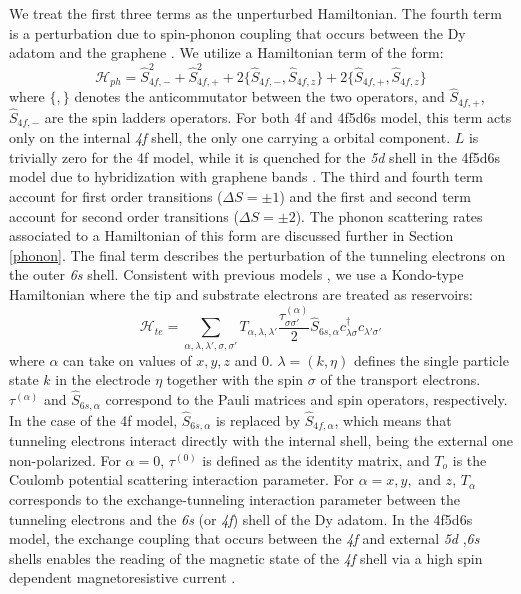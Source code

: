 \documentclass[reprint,amsmath,amssymb,aps,nofootinbib,onecolumn]{revtex4-2}
\begin{document}
We treat the first three terms as the unperturbed Hamiltonian. The fourth term is a perturbation due to spin-phonon coupling that occurs between the Dy adatom and the graphene \cite{Leuenberger2000,cervetti2016}. We utilize a Hamiltonian term of the form:
\begin{equation}
\mathcal{H}_{ph} = \hat{S}^{2}_{4f,-} + \hat{S}^{2}_{4f,+ } + 2 \{\hat{S}_{4f,-},\hat{S}_{4f,z}\} + 2 \{\hat{S}_{4f,+},\hat{S}_{4f,z}\}
\label{eq:ph}
\end{equation}
where $\{ ,\}$ denotes the anticommutator between the two operators, and $\hat{S}_{4f,+}$, $\hat{S}_{4f,-}$ are the spin ladders operators. For both 4f and 4f5d6s model, this term acts only on the internal \textit{4f} shell, the only one carrying a orbital component. $L$ is trivially zero for the 4f model, while it is quenched for the \textit{5d} shell in the 4f5d6s model due to hybridization with graphene bands \cite{donati2014}. The third and fourth term account for first order transitions ($\Delta S = \pm 1$) and the first and second term account for second order transitions ($\Delta S = \pm 2$). The phonon scattering rates associated to a Hamiltonian of this form are discussed further in Section \ref{phonon}. The final term describes the perturbation of the tunneling electrons on the outer \textit{6s} shell. Consistent with previous models \cite{anderson1966,schrieffer1966,appelbaum1967,delgado2010,loth2010,Ternes2015}, we use a Kondo-type Hamiltonian where the tip and substrate electrons are treated as reservoirs:  
\begin{equation}
\mathcal{H}_{te} = \sum_{\alpha,\lambda, \lambda',\sigma,\sigma'} T_{\alpha,\lambda, \lambda'} \frac{\tau^{(\alpha)}_{\sigma\sigma'}}{2} \hat{S}_{6s,\alpha} c^{\dagger}_{\lambda\sigma} c_{\lambda'\sigma'}
\end{equation}
where $\alpha$ can take on values of $x, y, z$ and $0$. $\lambda = (k,\eta)$ defines the single particle state $k$ in the electrode $\eta$ together with the spin $\sigma$ of the transport electrons. $\tau^{(\alpha)}$ and $\hat{S}_{6s,\alpha}$ correspond to the Pauli matrices and spin operators, respectively. In the case of the 4f model, $\hat{S}_{6s,\alpha}$ is replaced by $\hat{S}_{4f,\alpha}$, which means that tunneling electrons interact directly with the internal shell, being the external one non-polarized. For $\alpha = 0$, $\tau^{(0)}$ is defined as the identity matrix, and $T_{o}$ is the Coulomb potential scattering interaction parameter. For $\alpha = x, y,$ and $z$, $T_{\alpha}$ corresponds to the exchange-tunneling interaction parameter between the tunneling electrons and the \textit{6s} (or \textit{4f}) shell of the Dy adatom. In the 4f5d6s model, the exchange coupling that occurs between the \textit{4f} and external \textit{5d} ,\textit{6s} shells enables the reading of the magnetic state of the \textit{4f} shell via a high spin dependent magnetoresistive current \cite{pivettaMeasuringIntraAtomicExchange2020}. \par
\end{document}
